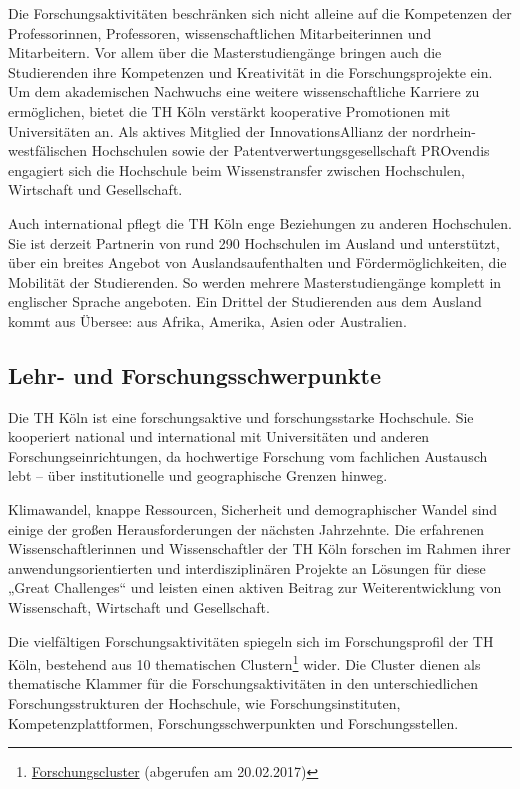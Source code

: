 Die Forschungsaktivitäten beschränken sich nicht alleine auf die
Kompetenzen der Professorinnen, Professoren, wissenschaftlichen
Mitarbeiterinnen und Mitarbeitern. Vor allem über die Masterstudiengänge
bringen auch die Studierenden ihre Kompetenzen und Kreativität in die
Forschungsprojekte ein. Um dem akademischen Nachwuchs eine weitere
wissenschaftliche Karriere zu ermöglichen, bietet die TH Köln verstärkt
kooperative Promotionen mit Universitäten an. Als aktives Mitglied der
InnovationsAllianz der nordrhein-westfälischen Hochschulen sowie der
Patentverwertungsgesellschaft PROvendis engagiert sich die Hochschule
beim Wissenstransfer zwischen Hochschulen, Wirtschaft und Gesellschaft.

Auch international pflegt die TH Köln enge Beziehungen zu anderen
Hochschulen. Sie ist derzeit Partnerin von rund 290 Hochschulen im
Ausland und unterstützt, über ein breites Angebot von
Auslandsaufenthalten und Fördermöglichkeiten, die Mobilität der
Studierenden. So werden mehrere Masterstudiengänge komplett in
englischer Sprache angeboten. Ein Drittel der Studierenden aus dem
Ausland kommt aus Übersee: aus Afrika, Amerika, Asien oder Australien.

\subsection{Lehr- und
Forschungsschwerpunkte}\label{lehr--und-forschungsschwerpunkte}

Die TH Köln ist eine forschungsaktive und forschungsstarke Hochschule.
Sie kooperiert national und international mit Universitäten und anderen
Forschungseinrichtungen, da hochwertige Forschung vom fachlichen
Austausch lebt -- über institutionelle und geographische Grenzen hinweg.

Klimawandel, knappe Ressourcen, Sicherheit und demographischer Wandel
sind einige der großen Herausforderungen der nächsten Jahrzehnte. Die
erfahrenen Wissenschaftlerinnen und Wissenschaftler der TH Köln forschen
im Rahmen ihrer anwendungsorientierten und interdisziplinären Projekte
an Lösungen für diese „Great Challenges`` und leisten einen aktiven
Beitrag zur Weiterentwicklung von Wissenschaft, Wirtschaft und
Gesellschaft.

Die vielfältigen Forschungsaktivitäten spiegeln sich im Forschungsprofil
der TH Köln, bestehend aus 10 thematischen Clustern\footnote{\href{https://www.th-koeln.de/forschung/cluster_2734.php}{Forschungscluster}
  (abgerufen am 20.02.2017)} wider. Die Cluster dienen als thematische
Klammer für die Forschungsaktivitäten in den unterschiedlichen
Forschungsstrukturen der Hochschule, wie Forschungsinstituten,
Kompetenzplattformen, Forschungsschwerpunkten und Forschungsstellen.

